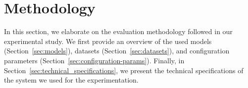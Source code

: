 \section{Methodology}\label{sec:experimental_setup}



In this section, we elaborate on the evaluation methodology followed in our experimental study. We first provide an overview of the used models (Section~\ref{sec:models}), datasets (Section~\ref{sec:datasets}), and configuration parameters (Section~\ref{sec:configuration-params}). Finally, in Section~\ref{sec:technical_specifications}, we present the technical specifications of the system we used for the experimentation.  







